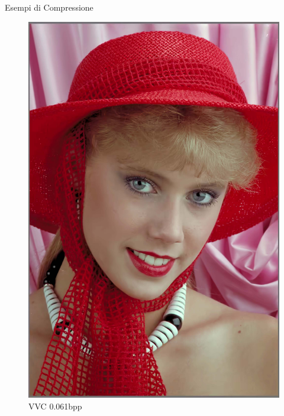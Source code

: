 \begin{frame}{Esempi di Compressione}
\begin{figure}[!ht]
\begin{minipage}[]{0.13\linewidth}
                \includegraphics[width=\textwidth]{Immagini/IMAGES/VVC_1_IMG0004.pdf}
                \caption{VVC 0.061bpp}
                \label{fig:ExampleVVC}
            \end{minipage}
            \begin{minipage}[]{0.13\linewidth}
                \centering

\end{minipage}
\end{figure}
\end{frame}
